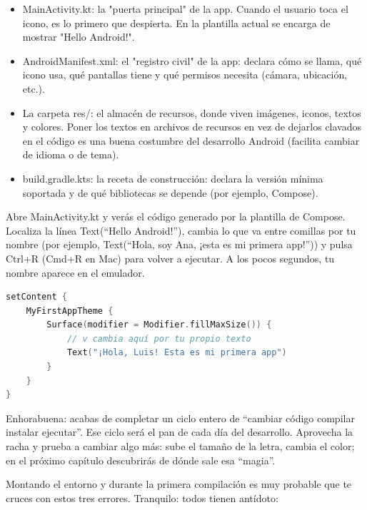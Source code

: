 \begin{itemize}
  \item MainActivity.kt: la "puerta principal" de la app. Cuando el usuario toca el icono, es lo primero que despierta. En la plantilla actual se encarga de mostrar "Hello Android!".
  \item AndroidManifest.xml: el "registro civil" de la app: declara cómo se llama, qué icono usa, qué pantallas tiene y qué permisos necesita (cámara, ubicación, etc.).
  \item La carpeta res/: el almacén de recursos, donde viven imágenes, iconos, textos y colores. Poner los textos en archivos de recursos en vez de dejarlos clavados en el código es una buena costumbre del desarrollo Android (facilita cambiar de idioma o de tema).
  \item build.gradle.kts: la receta de construcción: declara la versión mínima soportada y de qué bibliotecas se depende (por ejemplo, Compose).
\end{itemize}


Abre MainActivity.kt y verás el código generado por la plantilla de Compose. Localiza la línea Text(“Hello Android!”), cambia lo que va entre comillas por tu nombre (por ejemplo, Text(“Hola, soy Ana, ¡esta es mi primera app!”)) y pulsa Ctrl+R (Cmd+R en Mac) para volver a ejecutar. A los pocos segundos, tu nombre aparece en el emulador.

\begin{lstlisting}[language=Kotlin]
setContent {
    MyFirstAppTheme {
        Surface(modifier = Modifier.fillMaxSize()) {
            // v cambia aquí por tu propio texto
            Text("¡Hola, Luis! Esta es mi primera app")
        }
    }
}
\end{lstlisting}

Enhorabuena: acabas de completar un ciclo entero de “cambiar código compilar instalar ejecutar”. Ese ciclo será el pan de cada día del desarrollo. Aprovecha la racha y prueba a cambiar algo más: sube el tamaño de la letra, cambia el color; en el próximo capítulo descubrirás de dónde sale esa “magia”.


Montando el entorno y durante la primera compilación es muy probable que te cruces con estos tres errores. Tranquilo: todos tienen antídoto:

